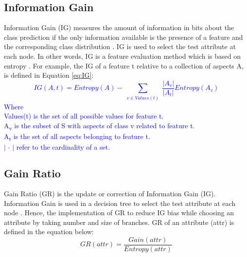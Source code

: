 \documentclass[review]{elsarticle}
\begin{document}
\subsection{Information Gain}
\label{subsec:IG}
Information Gain (IG) measures the amount of information in bits about the class prediction if the only information available is the presence of a feature and the corresponding class distribution \cite{Roobaert}. IG is used to select the test attribute at each node. In other words, IG is a feature evaluation method which is based on entropy \cite{Lei2012}. For example, the IG of a feature t relative to a collection of aspects A, is defined in Equation \ref{eq:IG}: 
\textcolor{blue}{
\begin{equation}
IG(A,t)=Entropy(A) - \sum_{\substack{v\in Values(t)}} \dfrac{|A_v|}{|A_t|} Entropy(A_v)
\label{eq:IG}
\end{equation}
Where\\
 Values(t) is the set of all possible values for feature t. \\
 A\textsubscript{v} is the subset of S with aspects of class v related to feature t.\\
 A\textsubscript{t} is the set of all aspects belonging to feature t.\\
$\vert$ $\cdot$ $\vert$ refer to the cardinality of a set.
}
 
\subsection{Gain Ratio}
\label{subsec:GR}
Gain Ratio (GR) is the update or correction of Information Gain (IG). Information Gain is used in a decision tree to select the test attribute at each node \cite{Han2012}. Hence, the implementation of GR to reduce IG bias while choosing an attribute by taking number and size of branches. GR of an attribute (attr) is defined in the equation below: 
 \begin{equation}
 GR(attr)=\dfrac{Gain(attr)}{Entropy(attr)}
 \label{eq:GR}
 \end{equation}
 
\end{document}
